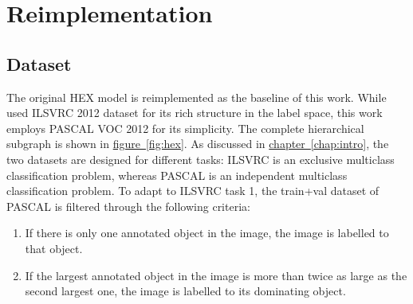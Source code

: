 \documentclass[11pt,a4paper]{book}
\begin{document}
\chapter{Reimplementation}
\label{chap:reimplement}
\section{Dataset}
\label{sec:data}

The original HEX model is reimplemented as the baseline of this work. While \cite{deng2014large} used ILSVRC 2012 dataset \cite{ilsvrc15} for its rich structure in the label space, this work employs PASCAL VOC 2012 \cite{pascal-voc-2012} for its simplicity. The complete hierarchical subgraph is shown in \hyperref[fig:hex]{figure~\ref{fig:hex}}. As discussed in \hyperref[chap:intro]{chapter~\ref{chap:intro}}, the two datasets are designed for different tasks: ILSVRC is an exclusive multiclass classification problem, whereas PASCAL is an independent multiclass classification problem. To adapt to ILSVRC task 1, the train+val dataset of PASCAL is filtered through the following criteria:
\begin{enumerate}
\item If there is only one annotated object in the image, the image is labelled to that object.
\item If the largest annotated object in the image is more than twice as large as the second largest one, the image is labelled to its dominating object.
\end{enumerate}
\end{document}
